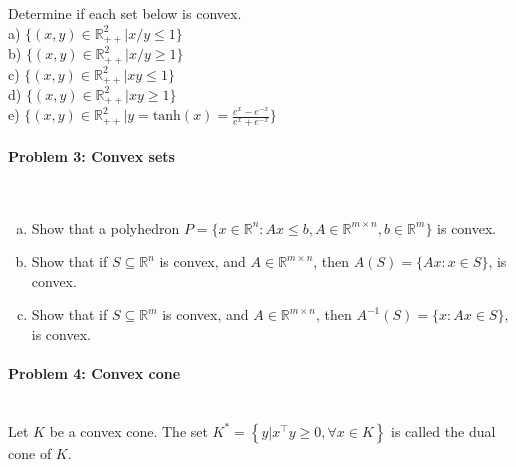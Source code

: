 \documentclass[a4paper]{article}
\newenvironment{solution}
{\color{blue} \paragraph{Solution.}}
{\newline \qed}
\begin{document}
\noindent
Determine if each set below is convex.\\

\noindent
a) $\{(x,y)\in \mathbb{R}^2_{++}|x/y\leq 1\}$\\

\noindent
b) $\{(x,y)\in \mathbb{R}^2_{++}|x/y\geq 1\}$\\

\noindent
c) $\{(x,y)\in \mathbb{R}^2_{++}|xy\leq 1\}$\\

\noindent
d) $\{(x,y)\in \mathbb{R}^2_{++}|xy\geq 1\}$\\

\noindent
e) $\{(x,y)\in \mathbb{R}^2_{++}|y= \text{tanh}(x)=\frac{e^x-e^{-x}}{e^x+e^{-x}}\}$\\



\paragraph{Problem 3: Convex sets}
~\\

\begin{enumerate}[a)]
	\item Show that a polyhedron $P=\{x\in \mathbb{R}^n: Ax \leq b, A\in \mathbb{R}^{m\times n}, b\in\mathbb{R}^m\}$ is convex.
	
	\item Show that if $S\subseteq  \mathbb{R}^n$ is convex, and $A \in \mathbb{R}^{m \times n}$,
	then $A(S) = \{ Ax : x \in S \}$, is convex.
	
	\item Show that if $S\subseteq  \mathbb{R}^m$ is convex, and $A \in \mathbb{R}^{m \times n}$,
	then $A^{-1}(S) = \{ x : Ax \in S \}$, is convex.
\end{enumerate}



\paragraph{Problem 4: Convex cone}
~\\

\noindent
Let $K$ be a convex cone. The set $K^* = \left\{y|x^\top y \geq 0, \forall x\in K\right\}$ is called the dual cone of $K$.
\end{document}
